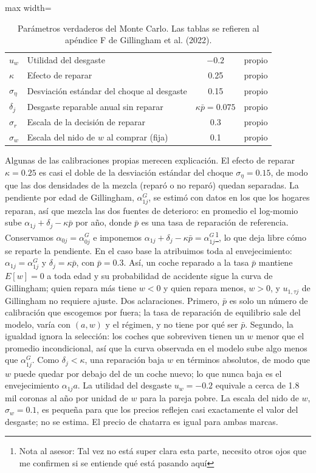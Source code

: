 \documentclass{article}
\begin{document}
\begin{table}[htbp]
\begin{adjustbox}{max width=\textwidth}
\begin{tabular}{llrrl}
$u_w$ & Utilidad del desgaste & \multicolumn{2}{c}{$-0.2$} & propio \\
$\kappa$ & Efecto de reparar & \multicolumn{2}{c}{0.25} & propio \\
$\sigma_\eta$ & Desviación estándar del choque al desgaste & \multicolumn{2}{c}{0.15} & propio \\
$\delta_j$ & Desgaste reparable anual sin reparar & \multicolumn{2}{c}{$\kappa\bar{p}=0.075$} & propio \\
$\sigma_r$ & Escala de la decisión de reparar & \multicolumn{2}{c}{0.3} & propio \\
$\sigma_w$ & Escala del nido de $w$ al comprar (fija) & \multicolumn{2}{c}{0.1} & propio \\
\bottomrule
\end{tabular}
\end{adjustbox}
\caption{Parámetros verdaderos del Monte Carlo. Las tablas se refieren al apéndice F de Gillingham et al. (2022).}
\label{tab:parametros}
\end{table}

Algunas de las calibraciones propias merecen explicación. El efecto de reparar $\kappa=0.25$ es casi el doble de la desviación estándar del choque $\sigma_\eta=0.15$, de modo que las dos densidades de la mezcla (reparó o no reparó) quedan separadas. La pendiente por edad de Gillingham, $\alpha^G_{1j}$, se estimó con datos en los que los hogares reparan, así que mezcla las dos fuentes de deterioro: en promedio el log-momio sube $\alpha_{1j}+\delta_j-\kappa\bar{p}$ por año, donde $\bar{p}$ es una tasa de reparación de referencia. Conservamos $\alpha_{0j}=\alpha^G_{0j}$ e imponemos $\alpha_{1j}+\delta_j-\kappa\bar{p}=\alpha^G_{1j}$\footnote{Nota al asesor: Tal vez no está super clara esta parte, necesito otros ojos que me confirmen si se entiende qué está pasando aquí}, lo que deja libre cómo se reparte la pendiente. En el caso base la atribuimos toda al envejecimiento: $\alpha_{1j}=\alpha^G_{1j}$ y $\delta_j=\kappa\bar{p}$, con $\bar{p}=0.3$. Así, un coche reparado a la tasa $\bar{p}$ mantiene $E[w]=0$ a toda edad y su probabilidad de accidente sigue la curva de Gillingham; quien repara más tiene $w<0$ y quien repara menos, $w>0$, y $u_{1,\tau j}$ de Gillingham no requiere ajuste. Dos aclaraciones. Primero, $\bar{p}$ es solo un número de calibración que escogemos por fuera; la tasa de reparación de equilibrio sale del modelo, varía con $(a,w)$ y el régimen, y no tiene por qué ser $\bar{p}$. Segundo, la igualdad ignora la selección: los coches que sobreviven tienen un $w$ menor que el promedio incondicional, así que la curva observada en el modelo sube algo menos que $\alpha^G_{1j}$. Como $\delta_j<\kappa$, una reparación baja $w$ en términos absolutos, de modo que $w$ puede quedar por debajo del de un coche nuevo; lo que nunca baja es el envejecimiento $\alpha_{1j}a$. La utilidad del desgaste $u_w=-0.2$ equivale a cerca de 1.8 mil coronas al año por unidad de $w$ para la pareja pobre. La escala del nido de $w$, $\sigma_w=0.1$, es pequeña para que los precios reflejen casi exactamente el valor del desgaste; no se estima. El precio de chatarra es igual para ambas marcas.
\end{document}
